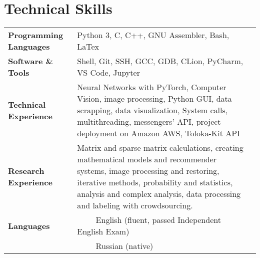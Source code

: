 \documentclass[11pt, a4paper]{article}
\begin{document}
\section*{Technical Skills}
\begin{tabular}{ l p{12cm}l }
    \textbf{Programming Languages} & Python 3, C, C++, GNU Assembler, Bash, LaTex \\ [0.8ex]
    \textbf{Software \& Tools} & Shell, Git, SSH, GCC, GDB, CLion, PyCharm, VS Code, Jupyter \\ [0.8ex]
    \textbf{Technical Experience} & Neural Networks with PyTorch, Computer Vision, image processing, Python GUI, 
    data scrapping, data visualization, System calls, multithreading, messengers' API, 
    project deployment on Amazon AWS, Toloka-Kit API \\ [0.8ex]
    \textbf{Research Experience} & Matrix and sparse matrix calculations, creating mathematical models and recommender systems, 
    image processing and restoring, iterative methods, probability and statistics, analysis and complex analysis, data processing and labeling with crowdsourcing. \\ [0.8ex]
    \textbf{Languages} & ~~\llap{\textbullet}~~ English (fluent, passed Independent English Exam) \\
    & ~~\llap{\textbullet}~~ Russian (native)
\end{tabular}
\end{document}
